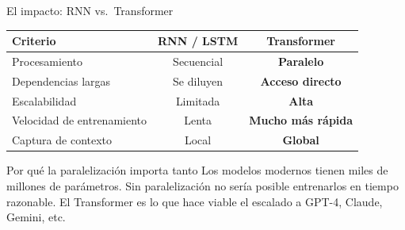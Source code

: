 \documentclass[aspectratio=169, 10pt]{beamer}
\newcommand{\concept}[1]{\textcolor{fenblue}{\textbf{#1}}}
\begin{document}
\begin{frame}{El impacto: RNN vs.\ Transformer}

  \begin{center}
  \begin{tabular}{lcc}
    \toprule
    \textbf{Criterio} & \textbf{RNN / LSTM} & \textbf{Transformer} \\
    \midrule
    Procesamiento & Secuencial & \concept{Paralelo} \\
    Dependencias largas & Se diluyen & \concept{Acceso directo} \\
    Escalabilidad & Limitada & \concept{Alta} \\
    Velocidad de entrenamiento & Lenta & \concept{Mucho más rápida} \\
    Captura de contexto & Local & \concept{Global} \\
    \bottomrule
  \end{tabular}
  \end{center}

  \vspace{0.5em}
  \begin{block}{Por qué la paralelización importa tanto}
    Los modelos modernos tienen miles de millones de parámetros. Sin paralelización no sería posible entrenarlos en tiempo razonable. El Transformer es lo que hace viable el escalado a GPT-4, Claude, Gemini, etc.
  \end{block}

\end{frame}

\end{document}
